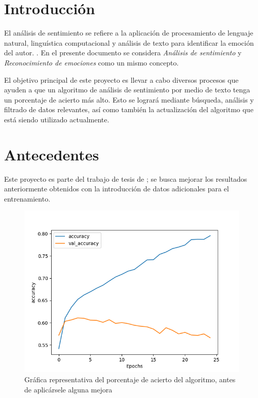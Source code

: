 \documentclass[a4]{sciposter}
\begin{document}
\begin{multicols}{3} 

\section{Introducción}
El análisis de sentimiento se refiere a la aplicación de procesamiento de lenguaje natural, linguística computacional y análisis de texto para identificar la emoción del autor. \citep{definition}. En el presente documento se considera \textit{Análisis de sentimiento} y \textit{Reconocimiento de emociones} como un mismo concepto.

El objetivo principal de este proyecto es llevar a cabo diversos procesos que ayuden a que un algoritmo de análisis de sentimiento por medio de texto tenga un porcentaje de acierto más alto. Esto se logrará mediante búsqueda, análisis y filtrado de datos relevantes, así como también la actualización del algoritmo que está siendo utilizado actualmente.

\section{Antecedentes}
Este proyecto es parte del trabajo de tesis de \citet{chatbot}; se busca mejorar los resultados anteriormente obtenidos con la introducción de datos adicionales para el entrenamiento.

\begin{figure}
	\centering
	\captionsetup{type=figure}
	\setcounter{figure}{0}
	\includegraphics[scale=1.3]{img/Accuracy 2020-05_nofilter}
	\caption{Gráfica representativa del porcentaje de acierto del algoritmo, antes de aplicársele alguna mejora}
	

\end{figure}
\end{multicols}
\end{document}
